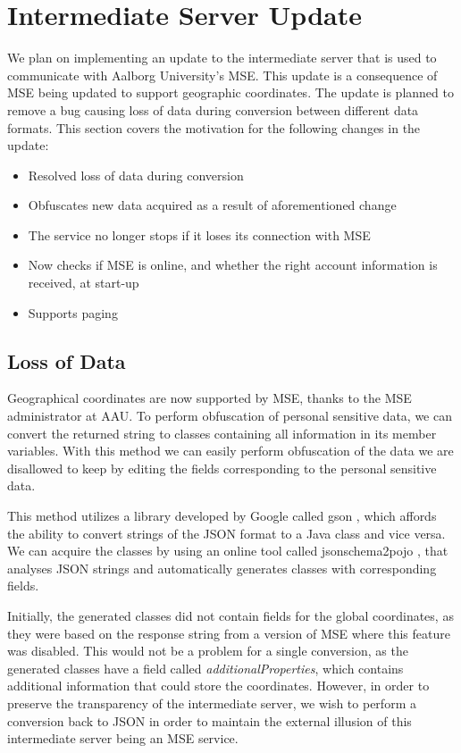\section{Intermediate Server Update}\label{sec:proxy_update1}
We plan on implementing an update to the intermediate server that is used to communicate with Aalborg University's MSE. This update is a consequence of MSE being updated to support geographic coordinates. The update is planned to remove a bug causing loss of data during conversion between different data formats. This section covers the motivation for the following changes in the update:

\begin{itemize}
\item Resolved loss of data during conversion
\item Obfuscates new data acquired as a result of aforementioned change
\item The service no longer stops if it loses its connection with MSE
\item Now checks if MSE is online, and whether the right account information is received, at start-up
\item Supports paging
\end{itemize}

\subsection*{Loss of Data}
Geographical coordinates are now supported by MSE, thanks to the MSE administrator at AAU. To perform obfuscation of personal sensitive data, we can convert the returned string to classes containing all information in its member variables. With this method we can easily perform obfuscation of the data we are disallowed to keep by editing the fields corresponding to the personal sensitive data.

This method utilizes a library developed by Google called gson \cite{gson}, which affords the ability to convert strings of the JSON format to a Java class and vice versa. We can acquire the classes by using an online tool called jsonschema2pojo \cite{jsonschematwopojo}, that analyses JSON strings and automatically generates classes with corresponding fields.

Initially, the generated classes did not contain fields for the global coordinates, as they were based on the response string from a version of MSE where this feature was disabled. This would not be a problem for a single conversion, as the generated classes have a field called \textit{additionalProperties}, which contains additional information that could store the coordinates. However, in order to preserve the transparency of the intermediate server, we wish to perform a conversion back to JSON in order to maintain the external illusion of this intermediate server being an MSE service.

